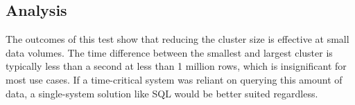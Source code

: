 \subsection{Analysis}
The outcomes of this test show that reducing the cluster size is effective at small data volumes. The time difference between the smallest and largest cluster is typically less than a second at less than 1 million rows, which is insignificant for most use cases. If a time-critical system was reliant on querying this amount of data, a single-system solution like SQL would be better suited regardless.
